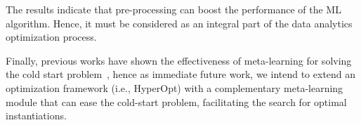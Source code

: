 The results indicate that pre-processing can boost the performance of the ML algorithm. Hence, it must be considered as an integral part of the data analytics optimization process. 

Finally, previous works have shown the effectiveness of meta-learning for solving the cold start problem~\cite{Feurer15AAAI}, hence as immediate future work, we intend to extend an optimization framework (i.e., HyperOpt) with a complementary meta-learning module that can ease the cold-start problem, facilitating the search for optimal instantiations.